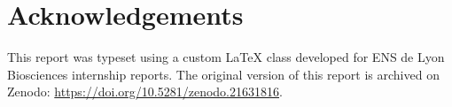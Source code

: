 \documentclass[blue]{enslyonstage}
\begin{document}
\section*{Acknowledgements}

This report was typeset using a custom \LaTeX{} class developed for ENS de
Lyon Biosciences internship reports. The original version of this report is
archived on Zenodo: \url{https://doi.org/10.5281/zenodo.21631816}.

%
%
\balance

\biblio
\end{document}
